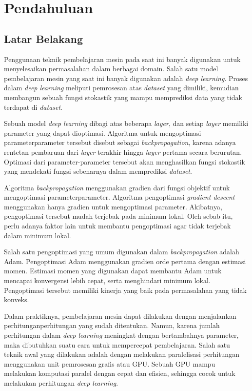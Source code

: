 \chapter{Pendahuluan}

\section{Latar Belakang}
\label{sec:latarbelakang}

Penggunaan teknik pembelajaran mesin pada saat ini banyak digunakan untuk menyelesaikan permasalahan dalam berbagai domain. Salah satu model pembelajaran mesin yang saat ini banyak digunakan adalah \emph{deep learning}. Proses dalam \emph{deep learning} meliputi pemrosesan atas \emph{dataset} yang dimiliki, kemudian membangun sebuah fungsi stokastik yang mampu memprediksi data yang tidak terdapat di \emph{dataset}.

Sebuah model \emph{deep learning} dibagi atas beberapa \emph{layer}, dan setiap \emph{layer} memiliki parameter yang dapat dioptimasi. Algoritma untuk mengoptimasi parameter\+parameter tersebut disebut sebagai \emph{backpropagation}, karena adanya rentetan pembaruan dari \emph{layer} terakhir hingga \emph{layer} pertama secara berurutan. Optimasi dari parameter-parameter tersebut akan menghasilkan fungsi stokastik yang mendekati fungsi sebenarnya dalam memprediksi \emph{dataset}.

Algoritma \emph{backpropagation} menggunakan gradien dari fungsi objektif untuk mengoptimasi parameter\+parameter. Algoritma pengoptimasi \emph{gradient descent} menggunakan hanya gradien untuk mengoptimasi parameter. Akibatnya, pengoptimasi tersebut mudah terjebak pada minimum lokal. Oleh sebab itu, perlu adanya faktor lain untuk membantu pengoptimasi agar tidak terjebak dalam minimum lokal.

Salah satu pengoptimasi yang umum digunakan dalam \emph{backpropagation} adalah Adam. Pengoptimasi Adam menggunakan gradien orde pertama dengan estimasi momen. Estimasi momen yang digunakan dapat membantu Adam untuk mencapai konvergensi lebih cepat, serta menghindari minimum lokal. Pengoptimasi tersebut memiliki kinerja yang baik pada permasalahan yang tidak konveks.

Dalam praktiknya, pembelajaran mesin dapat dilakukan dengan menjalankan perhitungan\+perhitungan yang sudah ditentukan. Namun, karena jumlah perhitungan dalam \emph{deep learning} meningkat dengan bertambahnya parameter, maka dibutuhkan suatu cara untuk mempercepat pembelajaran. Salah satu teknik awal yang dilakukan adalah dengan melakukan paralelisasi perhitungan menggunakan unit pemrosesan grafis atau GPU. Sebuah GPU mampu melakukan komputasi paralel dengan cepat dan efisien, sehingga cocok untuk melakukan perhitungan \emph{deep learning}.

